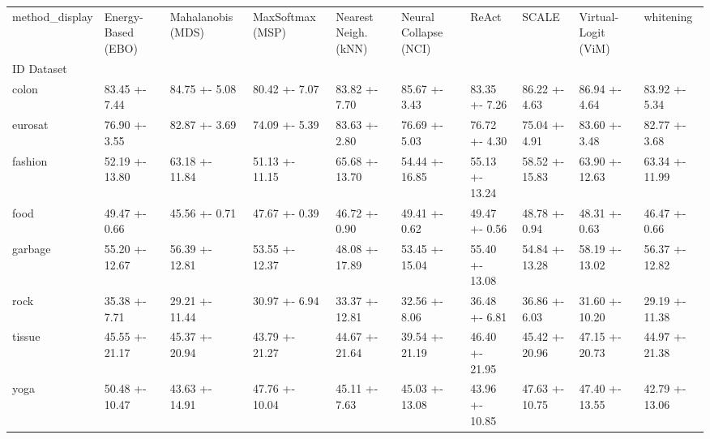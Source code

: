 \begin{tabular}{llllllllll}
\toprule
method_display & Energy-Based (EBO) & Mahalanobis (MDS) & MaxSoftmax (MSP) & Nearest Neigh. (kNN) & Neural Collapse (NCI) & ReAct & SCALE & Virtual-Logit (ViM) & whitening \\
ID Dataset &  &  &  &  &  &  &  &  &  \\
\midrule
colon & 83.45 +- 7.44 & 84.75 +- 5.08 & 80.42 +- 7.07 & 83.82 +- 7.70 & 85.67 +- 3.43 & 83.35 +- 7.26 & 86.22 +- 4.63 & 86.94 +- 4.64 & 83.92 +- 5.34 \\
eurosat & 76.90 +- 3.55 & 82.87 +- 3.69 & 74.09 +- 5.39 & 83.63 +- 2.80 & 76.69 +- 5.03 & 76.72 +- 4.30 & 75.04 +- 4.91 & 83.60 +- 3.48 & 82.77 +- 3.68 \\
fashion & 52.19 +- 13.80 & 63.18 +- 11.84 & 51.13 +- 11.15 & 65.68 +- 13.70 & 54.44 +- 16.85 & 55.13 +- 13.24 & 58.52 +- 15.83 & 63.90 +- 12.63 & 63.34 +- 11.99 \\
food & 49.47 +- 0.66 & 45.56 +- 0.71 & 47.67 +- 0.39 & 46.72 +- 0.90 & 49.41 +- 0.62 & 49.47 +- 0.56 & 48.78 +- 0.94 & 48.31 +- 0.63 & 46.47 +- 0.66 \\
garbage & 55.20 +- 12.67 & 56.39 +- 12.81 & 53.55 +- 12.37 & 48.08 +- 17.89 & 53.45 +- 15.04 & 55.40 +- 13.08 & 54.84 +- 13.28 & 58.19 +- 13.02 & 56.37 +- 12.82 \\
rock & 35.38 +- 7.71 & 29.21 +- 11.44 & 30.97 +- 6.94 & 33.37 +- 12.81 & 32.56 +- 8.06 & 36.48 +- 6.81 & 36.86 +- 6.03 & 31.60 +- 10.20 & 29.19 +- 11.38 \\
tissue & 45.55 +- 21.17 & 45.37 +- 20.94 & 43.79 +- 21.27 & 44.67 +- 21.64 & 39.54 +- 21.19 & 46.40 +- 21.95 & 45.42 +- 20.96 & 47.15 +- 20.73 & 44.97 +- 21.38 \\
yoga & 50.48 +- 10.47 & 43.63 +- 14.91 & 47.76 +- 10.04 & 45.11 +- 7.63 & 45.03 +- 13.08 & 43.96 +- 10.85 & 47.63 +- 10.75 & 47.40 +- 13.55 & 42.79 +- 13.06 \\
\bottomrule
\end{tabular}
